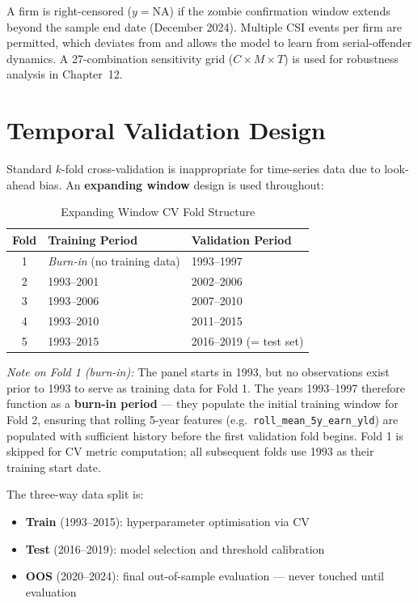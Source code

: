 \documentclass{report}\usepackage[]{graphicx}\usepackage[table]{xcolor}
\begin{document}
\noindent A firm is right-censored ($y = \text{NA}$) if the zombie confirmation window 
extends beyond the sample end date (December 2024). Multiple CSI events per firm are 
permitted, which deviates from \citet{Tewari2024} and allows the model to learn from 
serial-offender dynamics. A 27-combination sensitivity grid ($C \times M \times T$) 
is used for robustness analysis in Chapter~12.

\section{Temporal Validation Design}

Standard $k$-fold cross-validation is inappropriate for time-series data due to look-ahead 
bias. An \textbf{expanding window} design is used throughout:

\begin{table}[H]
\centering
\caption{Expanding Window CV Fold Structure}
\begin{tabular}{cll}
\toprule
\textbf{Fold} & \textbf{Training Period} & \textbf{Validation Period} \\
\midrule
1 & \textit{Burn-in} (no training data) & 1993--1997 \\
2 & 1993--2001 & 2002--2006 \\
3 & 1993--2006 & 2007--2010 \\
4 & 1993--2010 & 2011--2015 \\
5 & 1993--2015 & 2016--2019 (= test set) \\
\bottomrule
\end{tabular}
\end{table}

\noindent \textit{Note on Fold 1 (burn-in):} The panel starts in 1993, but no observations
exist prior to 1993 to serve as training data for Fold 1. The years 1993--1997 therefore
function as a \textbf{burn-in period} — they populate the initial training window for
Fold 2, ensuring that rolling 5-year features (e.g.\ \texttt{roll\_mean\_5y\_earn\_yld})
are populated with sufficient history before the first validation fold begins.
Fold 1 is skipped for CV metric computation; all subsequent folds use 1993 as their
training start date.

\noindent The three-way data split is:
\begin{itemize}
    \item \textbf{Train} (1993--2015): hyperparameter optimisation via CV
    \item \textbf{Test} (2016--2019): model selection and threshold calibration
    \item \textbf{OOS} (2020--2024): final out-of-sample evaluation — never touched until evaluation
\end{itemize}
\end{document}
